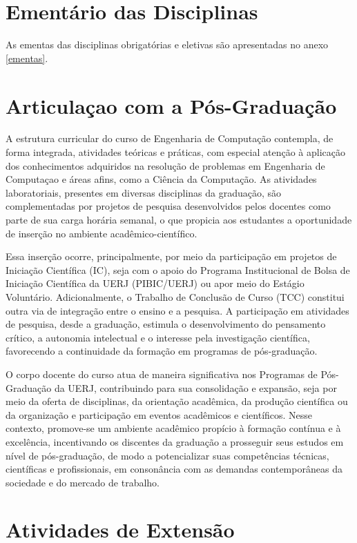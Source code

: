 \section{Ementário das Disciplinas}

As ementas das disciplinas obrigatórias e eletivas são apresentadas no anexo \ref{ementas}.

\section{Articulaçao com a Pós-Graduação }

A estrutura curricular do curso de Engenharia de Computação contempla, de forma integrada, atividades teóricas e práticas, com especial atenção à aplicação dos conhecimentos adquiridos na resolução de problemas em Engenharia de Computaçao e áreas afins, como a Ciência da Computação. As atividades laboratoriais, presentes em diversas disciplinas da graduação, são complementadas por projetos de pesquisa desenvolvidos pelos docentes como parte de sua carga horária semanal, o que propicia aos estudantes a oportunidade de inserção no ambiente acadêmico-científico.

Essa inserção ocorre, principalmente, por meio da participação em projetos de Iniciação Científica (IC), seja com o apoio do Programa Institucional de Bolsa de Iniciação Científica da UERJ (PIBIC/UERJ) ou apor meio do Estágio Voluntário. Adicionalmente, o Trabalho de Conclusão de Curso (TCC) constitui outra via de integração entre o ensino e a pesquisa. A participação em atividades de pesquisa, desde a graduação, estimula o desenvolvimento do pensamento crítico, a autonomia intelectual e o interesse pela investigação científica, favorecendo a continuidade da formação em programas de pós-graduação.

O corpo docente do curso atua de maneira significativa nos Programas de Pós-Graduação da UERJ, contribuindo para sua consolidação e expansão, seja por meio da oferta de disciplinas, da orientação acadêmica, da produção científica ou da organização e participação em eventos acadêmicos e científicos. Nesse contexto, promove-se um ambiente acadêmico propício à formação contínua e à excelência, incentivando os discentes da graduação a prosseguir seus estudos em nível de pós-graduação, de modo a potencializar suas competências técnicas, científicas e profissionais, em consonância com as demandas contemporâneas da sociedade e do mercado de trabalho.

\section{Atividades de Extensão}

